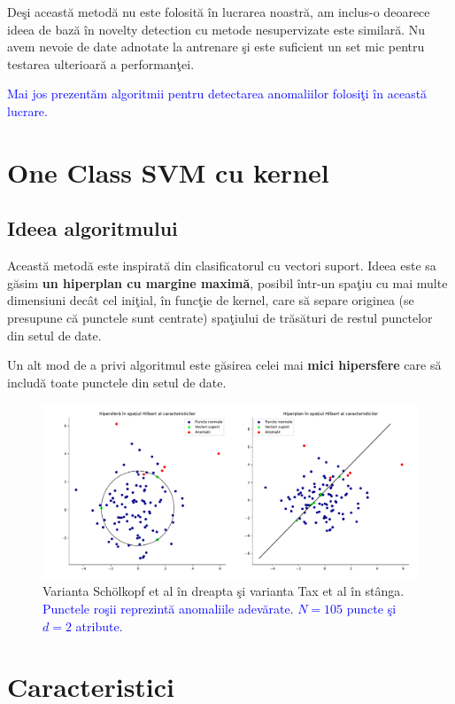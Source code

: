 Deşi această metodă nu este folosită în lucrarea noastră, am inclus-o deoarece 
ideea de bază în novelty detection cu metode nesupervizate este similară. Nu avem 
nevoie de date adnotate la antrenare şi este suficient un set mic pentru testarea 
ulterioară a performanţei.

\textcolor{blue}{
Mai jos prezentăm algoritmii pentru detectarea anomaliilor folosiţi în această lucrare.
}

\section{One Class SVM cu kernel}

\subsection{Ideea algoritmului}

Această metodă este inspirată din clasificatorul cu vectori suport. Ideea este 
sa găsim \textbf{un hiperplan cu margine maximă}, posibil într-un spaţiu cu 
mai multe dimensiuni decât cel iniţial, în funcţie de kernel,
care să separe originea (se presupune că punctele sunt centrate) spaţiului de trăsături
de restul punctelor din setul de date\cite{scholkopf2000support}.

Un alt mod de a privi algoritmul este găsirea celei mai \textbf{mici 
hipersfere} care să includă toate punctele din setul de date\cite{tax2004support}.

\begin{figure}[H]
    \centering
    \includegraphics[width=\linewidth]{images/cvx_ocsvm_figures.pdf}
    \caption{Varianta Schölkopf et al în dreapta şi varianta Tax et al în stânga.
    \textcolor{blue}{
        Punctele roşii reprezintă anomaliile adevărate. 
        $N=105$ puncte şi $d=2$ atribute.}
    }
\end{figure}

\section{Caracteristici}

